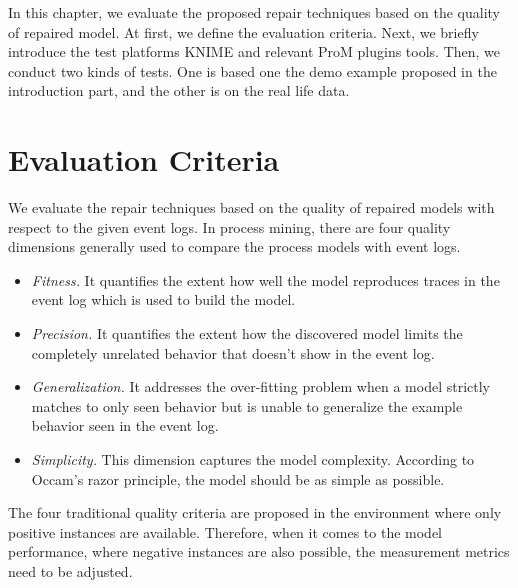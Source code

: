In this chapter, we evaluate the proposed repair techniques based on the quality of repaired model. At first, we define the evaluation criteria. Next, we briefly introduce the test platforms KNIME and relevant ProM plugins tools. Then, we conduct two kinds of tests. One is based one the demo example proposed in the introduction part, and the other is on the real life data. 
\section{Evaluation Criteria}
We evaluate the repair techniques based on the quality of repaired models with respect to the given event logs. In process mining, there are four quality dimensions generally used to compare the process models with event logs. 
\begin{itemize}
	\item \emph{Fitness.} It quantifies the extent how well the model reproduces traces in the event log which is used to build the model.   
	\item \emph{Precision.} It quantifies the extent how the discovered model limits the completely unrelated behavior that doesn't show in the event log. 
	\item \emph{Generalization.} It addresses the over-fitting problem when a model strictly matches to only seen behavior but is unable to generalize the example behavior seen in the event log. 
	\item \emph{Simplicity.} This dimension captures the model complexity. According to Occam's razor principle, the model should be as simple as possible.
\end{itemize}
The four traditional quality criteria are proposed in the environment where only positive instances are available. Therefore, when it comes to the model performance, where negative instances are also possible, the measurement metrics need to be adjusted. 

